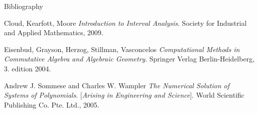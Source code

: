 \documentclass[german,10pt,xcolor=colortbl,compress,handout]{beamer}
\begin{document}

\begin{frame}{Bibliography}
    
    \begin{thebibliography}{9}
         Cloud, Kearfott, Moore
            \textit{Introduction to Interval Analysis}.
            Society for Industrial and Applied Mathematics, 2009.


         Eisenbud, Grayson, Herzog, Stillman, Vasconcelos
            \textit{Computational Methods in Commutative Algebra and Algebraic Geometry}.
            Springer Verlag Berlin-Heidelberg, 3. edition 2004.

         Andrew J. Sommese and Charles W. Wampler
            \textit{The Numerical Solution of Systems of Polynomials}. [\textit{Arising in
            Engineering and Science}].
            World Scientific Publishing Co. Pte. Ltd., 2005.

    \end{thebibliography}
\end{frame}
\end{document}
